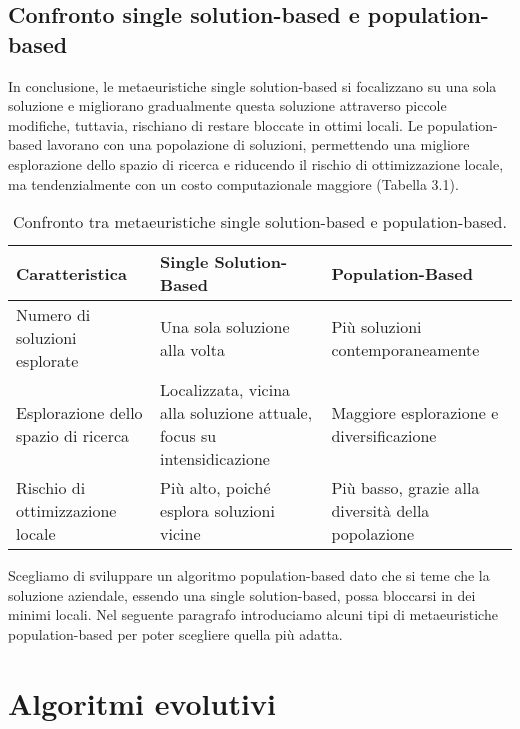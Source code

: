 \subsection{Confronto single solution-based e population-based}

In conclusione, le metaeuristiche single solution-based si focalizzano su una sola soluzione e migliorano gradualmente questa soluzione attraverso piccole modifiche, tuttavia, rischiano di restare bloccate in ottimi locali. Le population-based lavorano con una popolazione di soluzioni, permettendo una migliore esplorazione dello spazio di ricerca e riducendo il rischio di ottimizzazione locale, ma tendenzialmente con un costo computazionale maggiore (Tabella 3.1).

\begin{table}[!ht]
    \centering
    \renewcommand{\arraystretch}{1.7}
    \begin{tabular}{|>{\raggedright\arraybackslash}p{4cm}|>{\raggedright\arraybackslash}p{4cm}|>{\raggedright\arraybackslash}p{4cm}|}
    \hline
    \textbf{Caratteristica} & \textbf{Single Solution-Based} & \textbf{Population-Based} \\ \hline
    Numero di soluzioni esplorate & Una sola soluzione alla volta & Più soluzioni contemporaneamente \\ \hline
    Esplorazione dello spazio di ricerca & Localizzata, vicina alla soluzione attuale, focus su intensidicazione & Maggiore esplorazione e diversificazione \\ \hline
    Rischio di ottimizzazione locale & Più alto, poiché esplora soluzioni vicine & Più basso, grazie alla diversità della popolazione \\ \hline
    \end{tabular}
    \caption[]{Confronto tra metaeuristiche single solution-based e population-based.}
    \label{tab:comparison}
\end{table}

Scegliamo di sviluppare un algoritmo population-based dato che si teme che la soluzione aziendale, essendo una single solution-based, possa bloccarsi in dei minimi locali. Nel seguente paragrafo introduciamo alcuni tipi di metaeuristiche population-based per poter scegliere quella più adatta.

\section{Algoritmi evolutivi} \hypertarget{ea}{}

